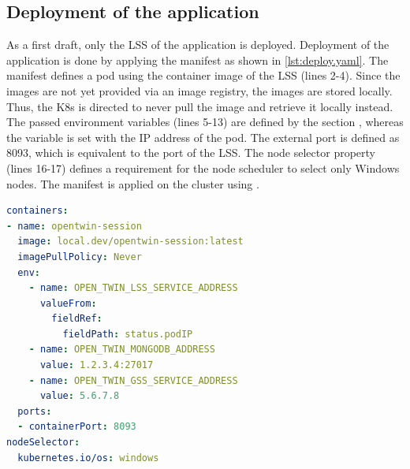 \subsection{Deployment of the application}
As a first draft, only the \ac{LSS} of the application is deployed. 
Deployment of the application is done by applying the manifest as shown in \autoref{lst:deploy.yaml}.
The manifest defines a pod using the container image of the \ac{LSS} (lines 2-4). Since the images are not yet provided via an image registry, the images are stored locally. Thus, the \ac{K8s} is directed to never pull the image and retrieve it locally instead.
The passed environment variables (lines 5-13) are defined by the section , whereas the variable  is set with the \ac{IP} address of the pod. The external port is defined as 8093, which is equivalent to the port of the \ac{LSS}.
The node selector property (lines 16-17) defines a requirement for the node scheduler to select only \ac{Windows} nodes.
The manifest is applied on the cluster using .
\begin{lstlisting}[label=lst:deploy.yaml, caption={Partial section of configuration for cluster deployment of the \ac{LSS} (\textit{Distribution/Kubernetes/open\_twin.yaml})}, language=yaml]
containers:
- name: opentwin-session
  image: local.dev/opentwin-session:latest
  imagePullPolicy: Never
  env:
    - name: OPEN_TWIN_LSS_SERVICE_ADDRESS
      valueFrom:
        fieldRef:
          fieldPath: status.podIP
    - name: OPEN_TWIN_MONGODB_ADDRESS
      value: 1.2.3.4:27017
    - name: OPEN_TWIN_GSS_SERVICE_ADDRESS
      value: 5.6.7.8
  ports:
  - containerPort: 8093
nodeSelector:
  kubernetes.io/os: windows
\end{lstlisting}


